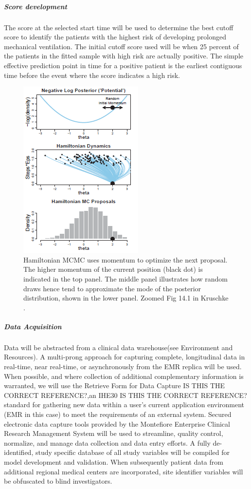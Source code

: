 \documentclass[11pt,notitlepage]{article}
\begin{document}
\subparagraph*{Score development}
The score at the selected start time will be used to determine the best cutoff score to identify the patients with the highest risk of developing prolonged mechanical ventilation. The initial cutoff score used will be when 25 percent of the patients in the fitted sample with high risk are actually positive. The simple effective prediction point in time for a positive patient is the earliest contiguous time before the event where the score indicates a high risk. 

\begin{figure}
 \vspace{-70pt}
 \includegraphics[scale=0.9]{Figures/Hamiltonian.png}
  \vspace{-30pt}
  \caption{\footnotesize Hamiltonian MCMC uses momentum to optimize the next proposal. The higher momentum of the current position (black dot) is indicated in the top panel. The middle panel illustrates how random draws hence tend to approximate the mode of the posterior distribution, shown in the lower panel. Zoomed Fig 14.1 in Kruschke \cite{Kruschke_Book_2014}.}
    \label{fig:Hamiltonian}
 \vspace{- 10 pt}
\end{figure}

\subparagraph*{Data Acquisition}
Data will be abstracted from a clinical data warehouse(see Environment and Resources). A multi-prong approach for capturing complete, longitudinal data in real-time, near real-time, or asynchronously from the EMR replica will be used. When possible, and where collection of additional complementary information is warranted, we will use the Retrieve Form for Data Capture IS THIS THE CORRECT REFERENCE?\cite{Rothenhaeusler_2005},an IHE30 IS THIS THE CORRECT REFERENCE? \cite{Rotte_15809512} standard for gathering new data within a user's current application environment (EMR in this case) to meet the requirements of an external system. Secured electronic data capture tools provided by the Montefiore Enterprise Clinical Research Management System will be used to streamline, quality control, normalize, and manage data collection and data entry efforts. A fully de-identified, study specific database of all study variables will be compiled for model development and validation. When subsequently patient data from additional regional medical centers are incorporated, site identifier variables will be obfuscated to blind investigators.
\end{document}
